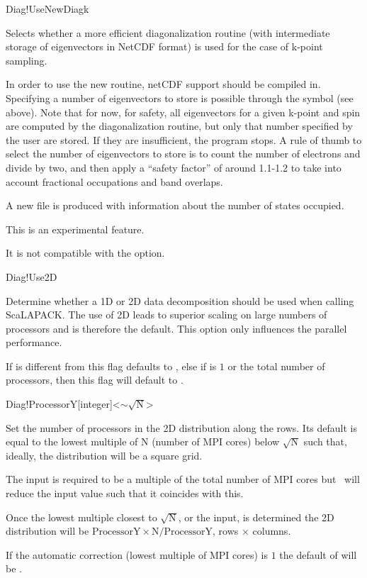 \begin{fdflogicalF}{Diag!UseNewDiagk}

  Selects whether a more efficient diagonalization routine (with
  intermediate storage of eigenvectors in NetCDF format) is used for
  the case of k-point sampling.

  In order to use the new routine, netCDF support should be compiled
  in.  Specifying a number of eigenvectors to store is possible
  through the symbol  (see above). Note that for
  now, for safety, all eigenvectors for a given k-point and spin are
  computed by the diagonalization routine, but only that number
  specified by the user are stored. If they are insufficient, the
  program stops.  A rule of thumb to select the number of eigenvectors
  to store is to count the number of electrons and divide by two, and
  then apply a ``safety factor'' of around 1.1-1.2 to take into account
  fractional occupations and band overlaps.

  A new file  is produced with information about the number
  of states occupied.

  This is an experimental feature. 

  \note It is not compatible with the 
  option.

\end{fdflogicalF}


\begin{fdflogicalT}{Diag!Use2D}

  Determine whether a 1D or 2D data decomposition should be used when
  calling ScaLAPACK. The use of 2D leads to superior scaling on large
  numbers of processors and is therefore the default. This option only
  influences the parallel performance.

  If  is different from  this flag
  defaults to \fdftrue, else if  is $1$ or the
  total number of processors, then this flag will default to
  \fdffalse.

\end{fdflogicalT}

\begin{fdfentry}{Diag!ProcessorY}[integer]<$\sim \sqrt{\mathrm N}$>

  Set the number of processors in the 2D distribution along the rows.
  Its default is equal to the lowest multiple of $\mathrm N$ (number
  of MPI cores) below $\sqrt{\mathrm N}$ such that, ideally, the
  distribution will be a square grid.

  The input is required to be a multiple of the total number of MPI
  cores but \siesta\ will reduce the input value such that it
  coincides with this.

  Once the lowest multiple closest to $\sqrt{\mathrm N}$, or the input, is
  determined the 2D distribution will be $\mathrm{ProcessorY}
  \times\mathrm{N}/\mathrm{ProcessorY}$, rows $\times$ columns.

  \note If the automatic correction (lowest multiple of MPI cores) is
  $1$ the default of  will be \fdffalse.

\end{fdfentry}

